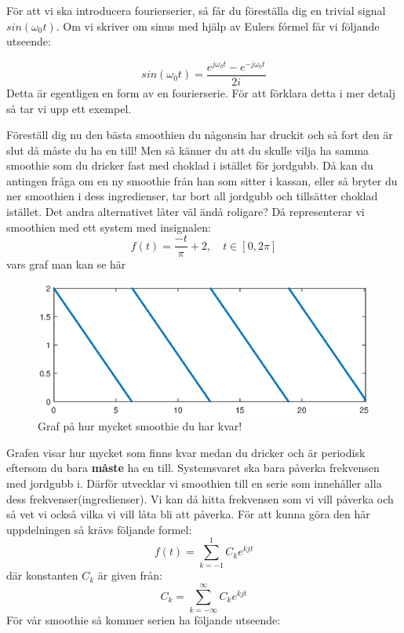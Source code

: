 \documentclass{article}
\begin{document}
För att vi ska introducera fourierserier, så får du föreställa dig en trivial signal $sin(\omega_0 t)$. Om vi skriver om sinus med hjälp av Eulers fórmel får vi följande utseende:

\[sin(\omega_0 t) = \frac{e^{j \omega_0 t}  - e^{-j \omega_0 t}}{2i}\]
Detta är egentligen en form av en fourierserie. För att förklara detta i mer detalj så tar vi upp ett exempel.

Föreställ dig nu den bästa smoothien du någonsin har druckit och så fort den är slut då måste du ha en till! Men så känner du att du skulle vilja ha samma smoothie som du dricker fast med choklad i istället för jordgubb. Då kan du antingen fråga om en ny smoothie från han som sitter i kassan, eller så bryter du ner smoothien i dess ingredienser, tar bort all jordgubb och tillsätter choklad istället. Det andra alternativet låter väl ändå roligare? 
Då representerar vi smoothien med ett system med insignalen:
\[ f(t) = \frac{-t}{\pi} + 2, \quad t \in [0,2 \pi] \]
vars graf man kan se här %
\begin{figure}[ht]
\centerline{\includegraphics[scale=0.55]{smoothie.eps}}
\caption{Graf på hur mycket smoothie du har kvar!}
\label{}
\end{figure}
Grafen visar hur mycket som finns kvar medan du dricker och är periodisk eftersom du bara \textbf{måste} ha en till. Systemsvaret ska bara påverka frekvensen med jordgubb i. Därför utvecklar vi smoothien till en serie som innehåller alla dess frekvenser(ingredienser). Vi kan då hitta frekvensen som vi vill påverka och så vet vi också vilka vi vill låta bli att påverka. För att kunna göra den här uppdelningen så krävs följande formel:
\[ f(t) = \sum_{k=-1}^1 C_k e^{k j t} \]
där konstanten $C_k$ är given från:
\[C_k = \sum_{k=-\infty}^{\infty} C_k e^{k j t}\] %
För vår smoothie så kommer serien ha följande utseende:
\end{document}
